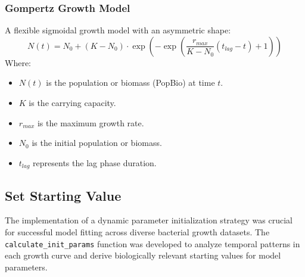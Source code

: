 \documentclass[11pt]{article}
\begin{document}
\subsubsection{Gompertz Growth Model}
A flexible sigmoidal growth model with an asymmetric shape:
\begin{equation}
N(t) = N_0 + (K - N_0) \cdot \exp\left(-\exp\left(\frac{r_{max}}{K - N_0} (t_{lag} - t) + 1\right)\right)
\end{equation}
Where:
\begin{itemize}
    \item $N(t)$ is the population or biomass (PopBio) at time $t$.
    \item $K$ is the carrying capacity.
    \item $r_{max}$ is the maximum growth rate.
    \item $N_0$ is the initial population or biomass.
    \item $t_{lag}$ represents the lag phase duration.
\end{itemize}

\subsection{Set Starting Value}
The implementation of a dynamic parameter initialization strategy was crucial for successful model fitting across diverse bacterial growth datasets. The \texttt{calculate\_init\_params} function was developed to analyze temporal patterns in each growth curve and derive biologically relevant starting values for model parameters.
\end{document}
